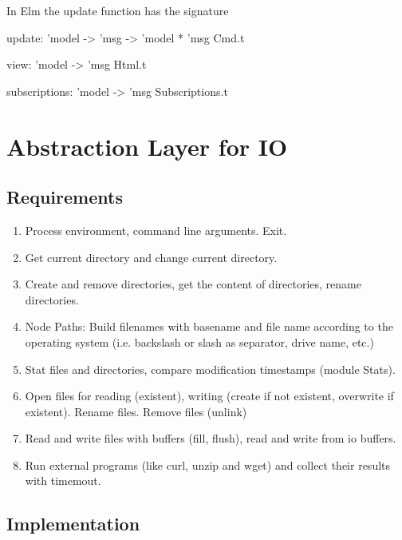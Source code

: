 In Elm the update function has the signature
\begin{ocaml}
  update: 'model -> 'msg -> 'model * 'msg Cmd.t

  view: 'model -> 'msg Html.t

  subscriptions: 'model -> 'msg Subscriptions.t
\end{ocaml}




\section{Abstraction Layer for IO}

\subsection{Requirements}

\begin{enumerate}

\item Process environment, command line arguments. Exit.

\item Get current directory and change current directory.

\item Create and remove directories, get the content of directories, rename
  directories.

\item Node Paths: Build filenames with basename and file name according to the
  operating system (i.e. backslash or slash as separator, drive name, etc.)

\item Stat files and directories, compare modification timestamps (module
  Stats).

\item Open files for reading (existent), writing (create if not existent,
  overwrite if existent). Rename files. Remove files (unlink)

\item Read and write files with buffers (fill, flush), read and write from io
  buffers.

\item Run external programs (like curl, unzip and wget) and collect their
  results with timemout.
\end{enumerate}


\subsection{Implementation}



